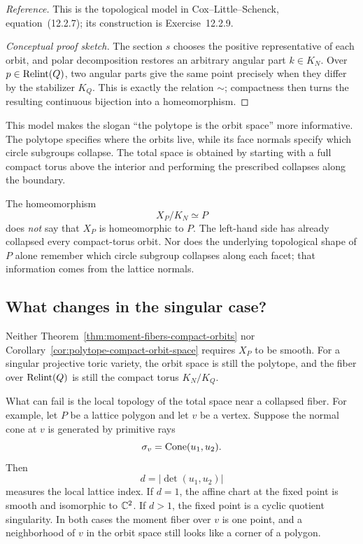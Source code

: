 \noindent
\textit{Reference.}
This is the topological model in Cox--Little--Schenck,
equation~(12.2.7); its construction is Exercise~12.2.9.

\begin{proof}[Conceptual proof sketch]
The section \(s\) chooses the positive representative of each orbit,
and polar decomposition restores an arbitrary angular part
\(k\in K_N\). Over \(p\in\operatorname{Relint}(Q)\), two angular parts
give the same point precisely when they differ by the stabilizer
\(K_Q\). This is exactly the relation \(\sim\); compactness then turns
the resulting continuous bijection into a homeomorphism.
\end{proof}

This model makes the slogan ``the polytope is the orbit space'' more
informative. The polytope specifies where the orbits live, while its
face normals specify which circle subgroups collapse. The total space
is obtained by starting with a full compact torus above the interior
and performing the prescribed collapses along the boundary.

\begin{warningbox}
The homeomorphism
\[
X_P/K_N\simeq P
\]
does \emph{not} say that \(X_P\) is homeomorphic to \(P\). The left-hand
side has already collapsed every compact-torus orbit. Nor does the
underlying topological shape of \(P\) alone remember which circle
subgroup collapses along each facet; that information comes from the
lattice normals.
\end{warningbox}

\subsection{What changes in the singular case?}

Neither Theorem~\ref{thm:moment-fibers-compact-orbits} nor
Corollary~\ref{cor:polytope-compact-orbit-space} requires \(X_P\) to be smooth.
For a singular projective toric variety, the orbit space is still the
polytope, and the fiber over \(\operatorname{Relint}(Q)\) is still the
compact torus \(K_N/K_Q\).

What can fail is the local topology of the total space near a collapsed
fiber. For example, let \(P\) be a lattice polygon and let \(v\) be a
vertex. Suppose the normal cone at \(v\) is generated by primitive rays
\[
\sigma_v=\operatorname{Cone}(u_1,u_2).
\]
Then
\[
d=|\det(u_1,u_2)|
\]
measures the local lattice index. If \(d=1\), the affine chart at the
fixed point is smooth and isomorphic to \(\mathbb{C}^2\). If \(d>1\), the
fixed point is a cyclic quotient singularity. In both cases the moment
fiber over \(v\) is one point, and a neighborhood of \(v\) in the
orbit space still looks like a corner of a polygon.

